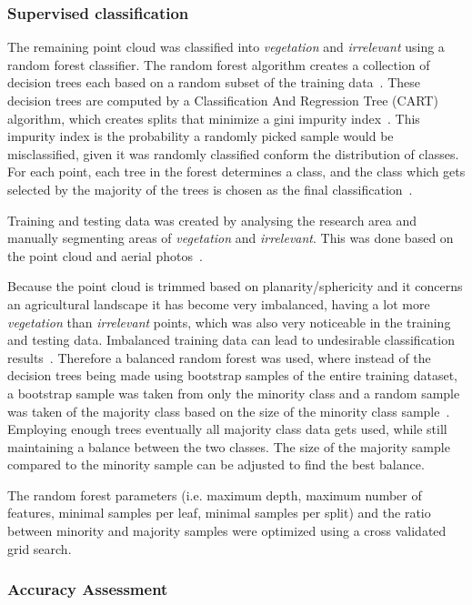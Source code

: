 {\subsubsection{Supervised classification}
The remaining point cloud was classified into \textit{vegetation} and \textit{irrelevant} using a random forest classifier. The random forest algorithm creates a collection of decision trees each based on a random subset of the training data~\citep{ho1998random}. These decision trees are computed by a Classification And Regression Tree (CART) algorithm, which creates splits that minimize a gini impurity index~\citep{breiman1984classification}. This impurity index is the probability a randomly picked sample would be misclassified, given it was randomly classified conform the distribution of classes. For each point, each tree in the forest determines a class, and the class which gets selected by the majority of the trees is chosen as the final classification~\citep{breiman2001random}.

Training and testing data was created by analysing the research area and manually segmenting areas of \textit{vegetation} and \textit{irrelevant}. This was done based on the point cloud and aerial photos~\citep{PDOK2015luchtfoto}. 

Because the point cloud is trimmed based on planarity/sphericity and it concerns an agricultural landscape it has become very imbalanced, having a lot more \textit{vegetation} than \textit{irrelevant} points, which was also very noticeable in the training and testing data. Imbalanced training data can lead to undesirable classification results~\citep{he2009learning}. Therefore a balanced random forest was used, where instead of the decision trees being made using bootstrap samples of the entire training dataset, a bootstrap sample was taken from only the minority class and a random sample was taken of the majority class based on the size of the minority class sample~\citep{Chen2004using}. Employing enough trees eventually all majority class data gets used, while still maintaining a balance between the two classes. The size of the majority sample compared to the minority sample can be adjusted to find the best balance.

The random forest parameters (i.e. maximum depth, maximum number of features, minimal samples per leaf, minimal samples per split) and the ratio between minority and majority samples were optimized using a cross validated grid search.

\subsubsection{Accuracy Assessment}

}
